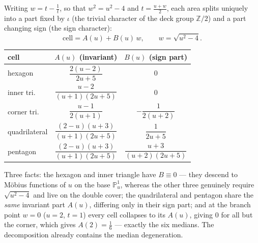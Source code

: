\documentclass[11pt,a4paper,reqno]{amsart}
\theoremstyle{definition}
\theoremstyle{remark}
\newcommand{\PP}{\mathbb{P}}
\newcommand{\ZZ}{\mathbb{Z}}
\begin{document}
Writing $w=t-\tfrac1t$, so that $w^2=u^2-4$ and $t=\tfrac{u+w}{2}$, each area splits uniquely into a part fixed by
$\iota$ (the trivial character of the deck group $\ZZ/2$) and a part changing sign (the sign character):
\[
\text{cell}=A(u)+B(u)\,w,\qquad w=\sqrt{u^2-4}.
\]
\begin{center}
\renewcommand{\arraystretch}{1.9}
\begin{tabular}{lcc}
\toprule
cell & $A(u)$ (invariant) & $B(u)$ (sign part) \\
\midrule
hexagon      & $\dfrac{2(u-2)}{2u+5}$ & $0$ \\
inner tri.   & $\dfrac{u-2}{(u+1)(2u+5)}$ & $0$ \\
corner tri.  & $\dfrac{u-1}{2(u+1)}$ & $-\dfrac{1}{2(u+2)}$ \\
quadrilateral& $\dfrac{(2-u)(u+3)}{(u+1)(2u+5)}$ & $\dfrac{1}{2u+5}$ \\
pentagon     & $\dfrac{(2-u)(u+3)}{(u+1)(2u+5)}$ & $\dfrac{u+3}{(u+2)(2u+5)}$ \\
\bottomrule
\end{tabular}
\end{center}
Three facts: the hexagon and inner triangle have $B\equiv0$ --- they descend to Möbius functions of $u$ on the base
$\PP^1_u$, whereas the other three genuinely require $\sqrt{u^2-4}$ and live on the double cover; the
quadrilateral and pentagon share the \emph{same} invariant part $A(u)$, differing only in their sign part; and at
the branch point $w=0$ ($u=2$, $t=1$) every cell collapses to its $A(u)$, giving $0$ for all but the corner, which
gives $A(2)=\tfrac16$ --- exactly the six medians. The decomposition already contains the median degeneration.
\end{document}
